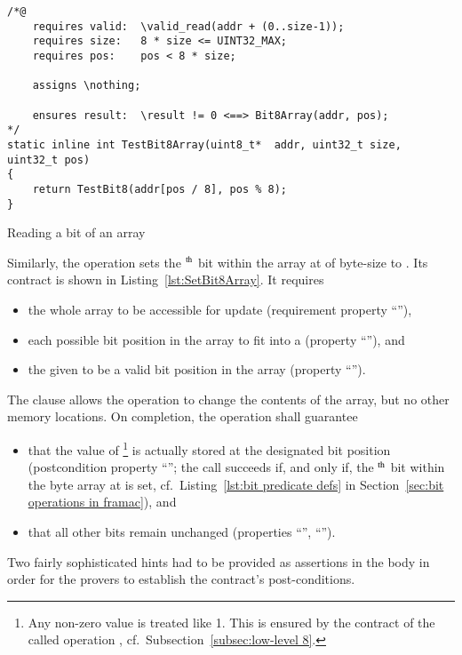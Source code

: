 \begin{listing}[hbt]
\begin{minipage}{0.99\textwidth}
\begin{lstlisting}[style=acsl-block]
/*@
    requires valid:  \valid_read(addr + (0..size-1));
    requires size:   8 * size <= UINT32_MAX;
    requires pos:    pos < 8 * size;

    assigns \nothing;

    ensures result:  \result != 0 <==> Bit8Array(addr, pos);
*/
static inline int TestBit8Array(uint8_t*  addr, uint32_t size, uint32_t pos)
{
    return TestBit8(addr[pos / 8], pos % 8);
}
\end{lstlisting}
\end{minipage}
\caption{\label{lst:TestBit8Array}Reading a bit of an  array}
\end{listing}

\FloatBarrier










Similarly, the operation 
sets the
$^{\mbox{\scriptsize th}}$ bit within the array at
 of
byte-size  to .
%
Its contract is shown in Listing~\ref{lst:SetBit8Array}.
%
It requires
%
\begin{itemize}
\item the whole array to be accessible for update (requirement
	property ``''),
\item each possible bit position in the array to fit into a
	 (property ``''), and
\item the given  to be a valid bit position in the array
	(property ``'').
\end{itemize}
%
The  clause allows the operation to change the
contents of the array,
but no other memory locations.
%
On completion, the operation shall guarantee
\begin{itemize}
\item that the value of \footnote{
		Any non-zero  value is treated like 1.
		This is ensured by the contract of the called operation
		, cf.\ Subsection~\ref{subsec:low-level 8}.
	}
	is actually stored at the designated bit
	position (postcondition property ``'';
	the call  succeeds if, and only if, the
	$^{\mbox{\scriptsize th}}$ bit within the byte
	array at  is set, 
	cf.\ Listing~\ref{lst:bit predicate defs} in
	Section~\ref{sec:bit operations in framac}), and
\item that all other bits remain unchanged 
	(properties ``'', ``'').
\end{itemize}
%
Two fairly sophisticated hints had to be provided as assertions in
the body in order for
the provers to establish the contract's post-conditions.









